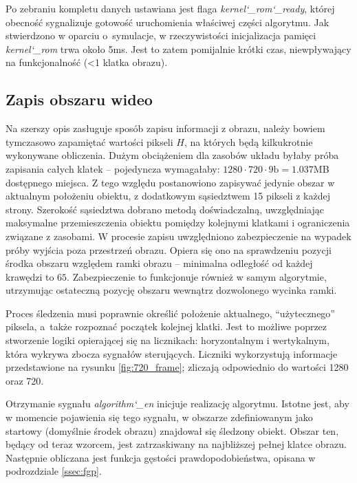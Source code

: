 Po zebraniu kompletu danych ustawiana jest flaga \textit{kernel\char`_rom\char`_ready}, której obecność sygnalizuje gotowość uruchomienia właściwej części algorytmu. 
Jak stwierdzono w oparciu o~symulacje, w rzeczywistości inicjalizacja pamięci \textit{kernel\char`_rom} trwa około 5ms. 
Jest to zatem pomijalnie krótki czas, niewpływający na funkcjonalność (<1 klatka obrazu).


\subsection{Zapis obszaru wideo}
\label{ssec:savideo}

Na szerszy opis zasługuje sposób zapisu informacji z obrazu, należy bowiem tymczasowo zapamiętać wartości pikseli $H$, na których będą kilkukrotnie wykonywane obliczenia. 
Dużym obciążeniem dla zasobów układu byłaby próba zapisania całych klatek -- pojedyncza wymagałaby: $1280\cdot720\cdot9\text{b} = 1.037$MB dostępnego miejsca. 
Z tego względu postanowiono zapisywać jedynie obszar w aktualnym położeniu obiektu, z dodatkowym sąsiedztwem 15 pikseli z każdej strony. 
Szerokość sąsiedztwa dobrano metodą doświadczalną, uwzględniając maksymalne przemieszczenia obiektu pomiędzy kolejnymi klatkami i ograniczenia związane z zasobami.
W procesie zapisu uwzględniono zabezpieczenie na wypadek próby wyjścia poza przestrzeń obrazu. 
Opiera się ono na sprawdzeniu pozycji środka obszaru względem ramki obrazu -- minimalna odległość od każdej krawędzi to $65$. 
Zabezpieczenie to funkcjonuje również w samym algorytmie, utrzymując ostateczną pozycję obszaru wewnątrz dozwolonego wycinka ramki.

Proces śledzenia musi poprawnie określić położenie aktualnego, \enquote{użytecznego} piksela, a~także rozpoznać początek kolejnej klatki. 
Jest to możliwe poprzez stworzenie logiki opierającej się na licznikach: horyzontalnym i wertykalnym, która wykrywa zbocza sygnałów sterujących. Liczniki wykorzystują informacje przedstawione na rysunku \ref{fig:720_frame}; zliczają odpowiednio do wartości 1280 oraz 720.

Otrzymanie sygnału \textit{algorithm\char`_en} inicjuje realizację algorytmu. 
Istotne jest, aby w momencie pojawienia się tego sygnału, w obszarze zdefiniowanym jako startowy (domyślnie środek obrazu) znajdował się śledzony obiekt. 
Obszar ten, będący od teraz wzorcem, jest zatrzaskiwany na najbliższej pełnej klatce obrazu. 
Następnie obliczana jest funkcja gęstości prawdopodobieństwa, opisana w podrozdziale \ref{ssec:fgp}. 

